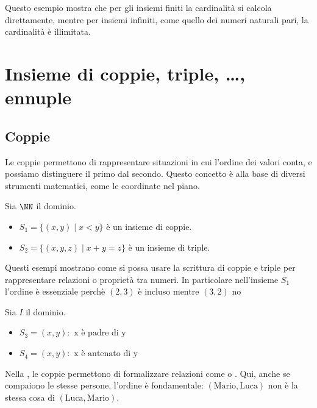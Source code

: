 Questo esempio mostra che per gli insiemi finiti la cardinalità si calcola direttamente, mentre per insiemi infiniti, come quello dei numeri naturali pari, la cardinalità è illimitata.



\section{Insieme di coppie, triple, \ldots, ennuple}
\subsection{Coppie}
Le coppie permettono di rappresentare situazioni in cui l'ordine dei valori conta, e possiamo distinguere il primo  dal secondo. Questo concetto è alla base di diversi strumenti matematici, come le coordinate nel piano.

\begin{esempio} Sia \(\NN\) il dominio.
\begin{itemize}
    \item $S_1 = \{(x,y) \mid x<y\}$ è un insieme di coppie.
    \item $S_2 = \{(x,y,z) \mid x+y=z\}$ è un insieme di triple.

\end{itemize}
\end{esempio}
Questi esempi mostrano come si possa usare la scrittura di coppie e triple per rappresentare relazioni o proprietà tra numeri. In particolare nell'insieme $S_1$ l'ordine è essenziale perchè $(2,3)$ è incluso mentre $(3,2)$ no 






\begin{esempio} 
Sia $I$  il dominio.
\begin{itemize}
\item $S_3 = {(x,y ) :\text{ x è  padre di y} }$
\item $S_4 = {(x,y ) :\text{ x è antenato di y }}$
\end{itemize}

\end{esempio}
Nella  , le coppie permettono di formalizzare relazioni come  o . Qui, anche se compaiono le stesse persone, l'ordine è fondamentale: $(\text{Mario}, \text{Luca})$ non è la stessa cosa di $(\text{Luca}, \text{Mario})$.

